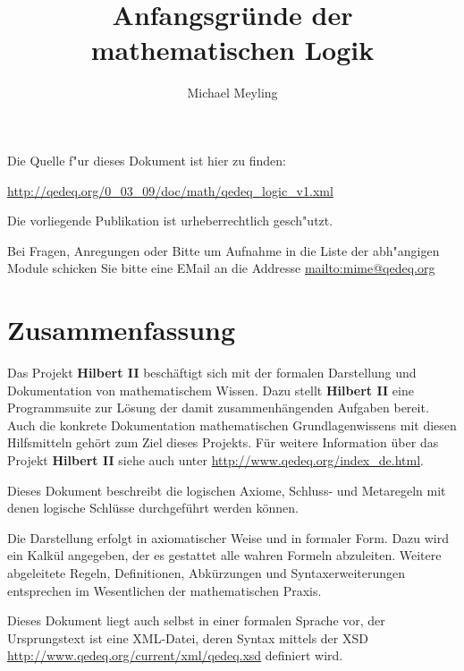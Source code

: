 \documentclass[a4paper,german,10pt,twoside]{book}
\title{Anfangsgr{\"u}nde der mathematischen Logik}
\author{
Michael Meyling
}
\theoremstyle{definition}
\theoremstyle{remark}
\begin{document}
\maketitle

\setlength{\parskip}{5pt plus 2pt minus 1pt}
\mbox{}
\vfill

\par
Die Quelle f{"ur} dieses Dokument ist hier zu finden:
\par
\url{http://qedeq.org/0_03_09/doc/math/qedeq_logic_v1.xml}

\par
Die vorliegende Publikation ist urheberrechtlich gesch{"u}tzt.
\par
Bei Fragen, Anregungen oder Bitte um Aufnahme in die Liste der abh{"a}ngigen Module schicken Sie bitte eine EMail an die Addresse \url{mailto:mime@qedeq.org}

\setlength{\parskip}{0pt}
\tableofcontents

\setlength{\parskip}{5pt plus 2pt minus 1pt}

\chapter*{Zusammenfassung} \label{chapter0} \hypertarget{chapter0}{}

Das Projekt \textbf{Hilbert II} besch{\"a}ftigt sich mit der formalen Darstellung und Dokumentation von mathematischem Wissen. Dazu stellt \textbf{Hilbert II} eine Programmsuite zur L{\"o}sung der damit zusammenh{\"a}ngenden Aufgaben bereit. Auch die konkrete Dokumentation mathematischen Grundlagenwissens mit diesen Hilfsmitteln geh{\"o}rt zum Ziel dieses Projekts. 
F{\"u}r weitere Information {\"u}ber das Projekt \textbf{Hilbert II} siehe auch unter \url{http://www.qedeq.org/index_de.html}.

\par
Dieses Dokument beschreibt die logischen Axiome, Schluss- und Metaregeln mit denen logische Schl{\"u}sse durchgef{\"u}hrt werden k{\"o}nnen.

\par
Die Darstellung erfolgt in axiomatischer Weise und in formaler Form. Dazu wird ein Kalk{\"u}l angegeben, der es gestattet alle wahren Formeln abzuleiten. Weitere abgeleitete Regeln, Definitionen, Abk{\"u}rzungen und Syntaxerweiterungen entsprechen im Wesentlichen der mathematischen Praxis.

\par
Dieses Dokument liegt auch selbst in einer formalen Sprache vor, der Ursprungstext ist eine XML-Datei, deren Syntax mittels der XSD \url{http://www.qedeq.org/current/xml/qedeq.xsd} definiert wird.
\end{document}
